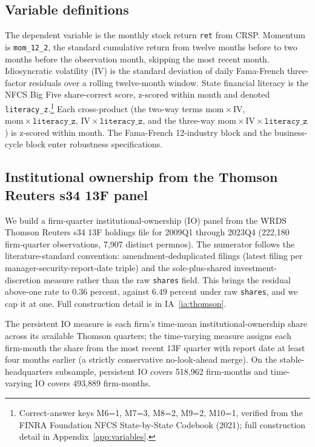 \subsection{Variable definitions}

The dependent variable is the monthly stock return \texttt{ret} from CRSP. Momentum is \texttt{mom\_12\_2}, the standard \citet{jegadeeshTitman1993} cumulative return from twelve months before to two months before the observation month, skipping the most recent month. Idiosyncratic volatility (IV) is the standard deviation of daily Fama-French three-factor residuals over a rolling twelve-month window. State financial literacy is the NFCS Big Five share-correct score, z-scored within month and denoted \texttt{literacy\_z}.\footnote{Correct-answer keys M6=1, M7=3, M8=2, M9=2, M10=1, verified from the FINRA Foundation NFCS State-by-State Codebook (2021); full construction detail in Appendix~\ref{app:variables}.} Each cross-product (the two-way terms $\mathrm{mom}\times\mathrm{IV}$, $\mathrm{mom}\times\mathtt{literacy\_z}$, $\mathrm{IV}\times\mathtt{literacy\_z}$, and the three-way $\mathrm{mom}\times\mathrm{IV}\times\mathtt{literacy\_z}$) is z-scored within month. The Fama-French 12-industry block and the \citet{korniotisKumar2013} business-cycle block enter robustness specifications.

\subsection{Institutional ownership from the Thomson Reuters s34 13F panel}

We build a firm-quarter institutional-ownership (IO) panel from the WRDS Thomson Reuters s34 13F holdings file for 2009Q1 through 2023Q4 (222,180 firm-quarter observations, 7,907 distinct permnos). The numerator follows the literature-standard convention: amendment-deduplicated filings (latest filing per manager-security-report-date triple) and the sole-plus-shared investment-discretion measure rather than the raw \texttt{shares} field. This brings the residual above-one rate to 0.36 percent, against 6.49 percent under raw \texttt{shares}, and we cap it at one. Full construction detail is in IA~\ref{ia:thomson}.

The persistent IO measure is each firm's time-mean institutional-ownership share across its available Thomson quarters; the time-varying measure assigns each firm-month the share from the most recent 13F quarter with report date at least four months earlier (a strictly conservative no-look-ahead merge). On the stable-headquarters subsample, persistent IO covers 518,962 firm-months and time-varying IO covers 493,889 firm-months.

